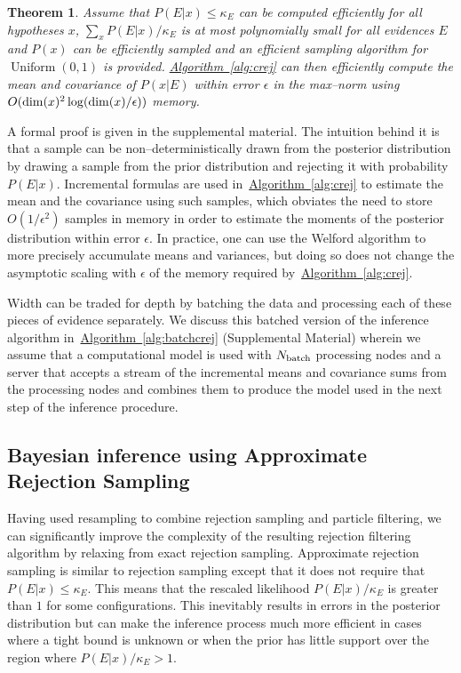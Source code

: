 \documentclass[twoside]{article}
\newtheorem{theorem}{Theorem}
\newcommand{\alg}[1]{\hyperref[alg:#1]{Algorithm~\ref*{alg:#1}}}
\begin{document}
\begin{theorem}
Assume that $P(E|x)\le \kappa_E$ can be computed efficiently for all hypotheses $x$, $\sum_x P(E|x)/\kappa_E$ is at most polynomially small for all
evidences $E$ and $P(x)$ can be efficiently sampled and an efficient sampling algorithm for $\operatorname{Uniform}(0,1)$ is provided.  \alg{crej} 
can then efficiently compute the mean and covariance of $P(x|E)$ within error $\epsilon$ in the max--norm using $O({\rm dim}(x)^2\log({\rm dim}(x)/\epsilon))$ memory.\label{thm:crej}
\end{theorem}
A formal proof is given in the supplemental material.  The intuition behind it is that a sample can be non--deterministically drawn from
the posterior distribution by drawing a
sample from the prior distribution and rejecting it with probability $P(E|x)$.  Incremental formulas are
used in~\alg{crej} to estimate the mean and the covariance using such samples, which obviates the need
to store $O(1/\epsilon^2)$ samples in memory in order to estimate the moments of the posterior distribution within error $\epsilon$.
In practice, one can use the Welford algorithm \cite{welford_note_1962} to more precisely accumulate means
and variances, but doing so does not change the asymptotic scaling with $\epsilon$ of the memory required by~\alg{crej}.

Width can be traded for depth by batching the data and processing each of
these pieces of evidence separately. We discuss this batched version of the
inference algorithm in~\alg{batchcrej} (Supplemental Material) wherein we
assume that a computational model is used with $N_{\rm batch}$ processing
nodes and a server that accepts a stream of the incremental means and
covariance sums from the processing nodes and combines them to produce the
model used in the next step of the inference procedure.

\subsection{Bayesian inference using Approximate Rejection Sampling}

Having used resampling to combine rejection sampling and particle filtering,
we can significantly improve the complexity of the resulting rejection filtering
algorithm by relaxing from exact rejection sampling.  Approximate rejection
sampling is similar to rejection sampling except
that it does not require that $P(E|x) \le \kappa_E$.  This means that the rescaled
likelihood $P(E|x)/\kappa_E$ is greater than $1$ for some
configurations.  This inevitably results in errors in the posterior distribution but can make the inference process much more efficient
in cases where a tight bound is unknown or when the prior has little support over the region where $P(E|x)/\kappa_E >1$.
\end{document}
